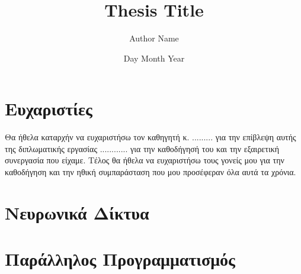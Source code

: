 \documentclass[12pt,twoside]{book}
\title{Thesis Title}
\author{Author Name}
\date{Day Month Year}
\newcommand{\en}[1]{\foreignlanguage{english}{#1}}
\begin{document}


\frontmatter





\chapter*{\centering \large Ευχαριστίες}

Θα ήθελα καταρχήν να ευχαριστήσω τον καθηγητή κ. .........
για την επίβλεψη αυτής της διπλωματικής εργασίας 
............ για την καθοδήγησή του και την εξαιρετική συνεργασία που είχαμε. Τέλος θα ήθελα να ευχαριστήσω τους γονείς μου για την καθοδήγηση και την ηθική συμπαράσταση που μου προσέφεραν όλα αυτά τα χρόνια.

\tableofcontents
{}%



\mainmatter


\chapter{Νευρωνικά Δίκτυα}


\chapter{Παράλληλος Προγραμματισμός}

\end{document}
